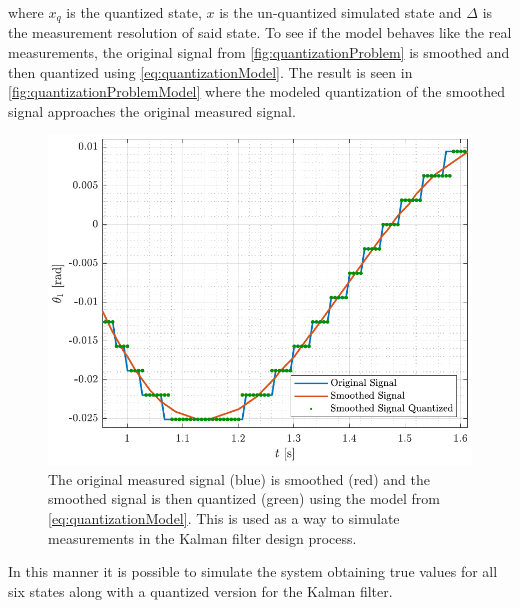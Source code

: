 where $x_q$ is the quantized state, $x$ is the un-quantized simulated state and $\Delta$ is the measurement resolution of said state. To see if the model behaves like the real measurements, the original signal from \autoref{fig:quantizationProblem} is smoothed and then quantized using \autoref{eq:quantizationModel}. The result is seen in \autoref{fig:quantizationProblemModel} where the modeled quantization of the smoothed signal approaches the original measured signal.
%
\begin{figure}[H]
  \includegraphics[width=.7\textwidth]{figures/quantizationProblemModel}
  \caption{The original measured signal (blue) is smoothed (red) and the smoothed signal is then quantized (green) using the model from \autoref{eq:quantizationModel}. This is used as a way to simulate measurements in the Kalman filter design process.}
  \label{fig:quantizationProblemModel}
\end{figure}
%
In this manner it is possible to simulate the system obtaining true values for all six states along with a quantized version for the Kalman filter.

